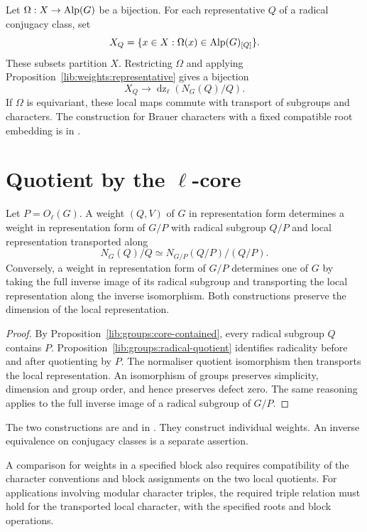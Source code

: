 \begin{example}
Let $\Omega:X\to\operatorname{Alp}(G)$ be a bijection. For each representative $Q$
of a radical conjugacy class, set
\[
 X_Q=\{x\in X:\Omega(x)\in\operatorname{Alp}(G)_{[Q]}\}.
\]
These subsets partition $X$. Restricting $\Omega$ and applying
Proposition~\ref{lib:weights:representative} gives a bijection
\[
 X_Q\longrightarrow\operatorname{dz}_\ell(N_G(Q)/Q).
\]
If $\Omega$ is equivariant, these local maps commute with transport
of subgroups and characters.
The construction for Brauer characters with a fixed compatible root
embedding is in
.
\end{example}

\newpage
\section{Quotient by the \texorpdfstring{$\ell$}{ell}-core}

\begin{proposition}
Let $P=O_\ell(G)$. A weight $(Q,V)$ of $G$ in representation form determines
a weight in representation form of $G/P$ with radical subgroup $Q/P$ and
local representation transported along
\[
 N_G(Q)/Q\simeq N_{G/P}(Q/P)/(Q/P).
\]
Conversely, a weight in representation form of $G/P$ determines one of $G$
by taking the full inverse image of its radical subgroup and
transporting the local representation along the inverse isomorphism.
Both constructions preserve the dimension of the local representation.
\end{proposition}
\begin{proof}
By Proposition~\ref{lib:groups:core-contained}, every radical subgroup
$Q$ contains $P$. Proposition~\ref{lib:groups:radical-quotient}
identifies radicality before and after quotienting by $P$.
The normaliser quotient isomorphism then transports the local
representation. An isomorphism of groups preserves simplicity,
dimension and group order, and hence preserves defect zero.
The same reasoning applies to the full inverse image of a radical
subgroup of $G/P$.
\end{proof}
\begin{implementation}
The two constructions are
 and
in .
They construct individual weights. An inverse equivalence on
conjugacy classes is a separate assertion.
\end{implementation}

A comparison for weights in a specified block also requires
compatibility of the character conventions and block assignments on
the two local quotients. For applications involving modular character
triples, the required triple relation must hold for the transported
local character, with the specified roots and block operations.

